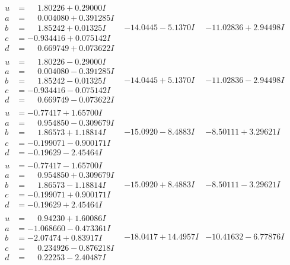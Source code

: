 \documentclass[1p]{elsarticle_modified}
\theoremstyle{definition}
\begin{document}
$$\begin{array}{c|c|c}
\begin{aligned}
u &= \phantom{-}1.80226 + 0.29000 I \\
a &= \phantom{-}0.004080 + 0.391285 I \\
b &= \phantom{-}1.85242 + 0.01325 I \\
c &= -0.934416 + 0.075142 I \\
d &= \phantom{-}0.669749 + 0.073622 I\end{aligned}
 & -14.0445 - 5.1370 I & -11.02836 + 2.94498 I \\ \hline\begin{aligned}
u &= \phantom{-}1.80226 - 0.29000 I \\
a &= \phantom{-}0.004080 - 0.391285 I \\
b &= \phantom{-}1.85242 - 0.01325 I \\
c &= -0.934416 - 0.075142 I \\
d &= \phantom{-}0.669749 - 0.073622 I\end{aligned}
 & -14.0445 + 5.1370 I & -11.02836 - 2.94498 I \\ \hline\begin{aligned}
u &= -0.77417 + 1.65700 I \\
a &= \phantom{-}0.954850 - 0.309679 I \\
b &= \phantom{-}1.86573 + 1.18814 I \\
c &= -0.199071 - 0.900171 I \\
d &= -0.19629 - 2.45464 I\end{aligned}
 & -15.0920 - 8.4883 I & -8.50111 + 3.29621 I \\ \hline\begin{aligned}
u &= -0.77417 - 1.65700 I \\
a &= \phantom{-}0.954850 + 0.309679 I \\
b &= \phantom{-}1.86573 - 1.18814 I \\
c &= -0.199071 + 0.900171 I \\
d &= -0.19629 + 2.45464 I\end{aligned}
 & -15.0920 + 8.4883 I & -8.50111 - 3.29621 I \\ \hline\begin{aligned}
u &= \phantom{-}0.94230 + 1.60086 I \\
a &= -1.068660 - 0.473361 I \\
b &= -2.07474 + 0.83917 I \\
c &= \phantom{-}0.234926 - 0.876218 I \\
d &= \phantom{-}0.22253 - 2.40487 I\end{aligned}
 & -18.0417 + 14.4957 I & -10.41632 - 6.77876 I\\

\end{array}$$
\end{document}
